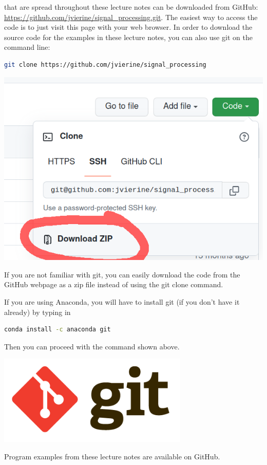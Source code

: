  that are spread throughout these lecture
notes can be downloaded from GitHub:
\url{https://github.com/jvierine/signal_processing.git}. The easiest
way to access the code is to just visit this page with your web
browser. In order to download the source code for the examples in
these lecture notes, you can also use git on the command line:
\begin{lstlisting}[language=sh,caption=Obtaining the source code for the programming examples with git,label=lst:download]
git clone https://github.com/jvierine/signal_processing
\end{lstlisting}
\begin{marginfigure}
\includegraphics[width=\textwidth]{ch02/figures/downloadgit.png}
\caption{If you are not familiar with git, you can easily download the code from the GitHub webpage as a zip file instead of using the git clone command.}
\end{marginfigure}
If you are using Anaconda, you will have to install git (if you don't
have it already) by typing in
\begin{lstlisting}[language=sh,caption=Obtaining the source code for the programming examples with git,label=lst:download]
  conda install -c anaconda git
\end{lstlisting}
Then you can proceed with the command shown above. 



\begin{marginfigure}
\includegraphics[width=0.68\textwidth]{ch02/figures/gitlogo.png}
\caption{Program examples from these lecture notes are available on GitHub.}
\end{marginfigure}
